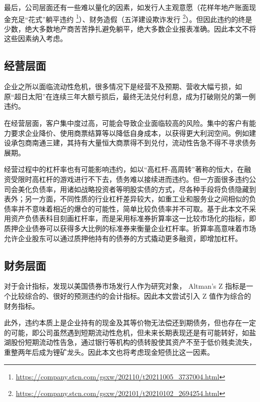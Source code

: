 最后，公司层面还有一些难以量化的因素，如发行人主观意愿（花样年地产账面现金充足“花式”躺平违约 \footnote{\url{https://company.stcn.com/gsxw/202110/t20211005_3737004.html}}）、财务造假（五洋建设欺诈发行 \footnote{\url{https://company.stcn.com/gsxw/202101/t20210102_2694254.html}}）。但因此违约的终是少数，绝大多数地产商苦苦挣扎避免躺平，绝大多数企业报表准确。因此本文不将这些因素纳入考虑。
\subsection{经营层面}
企业之所以面临流动性危机，很多情况下是经营不及预期、营收大幅亏损，如原“超日太阳”在连续三年大额亏损后，最终无法兑付利息，成为打破刚兑的第一例违约。

在经营层面，客户集中度过高，可能会导致企业面临较高的风险\cite{王雄元2017客户集中度与公司债二级市场信用利差}。集中的客户有能力要求企业降价、使用商票结算等以降低自身成本，以获得更大利润空间。例如建设承包商南通三建，其持有大量恒大商票得不到兑付，流动性告急不得不寻求债务展期。

经营过程中的杠杆率也有可能影响违约\cite{王永钦2019杠杆率如何影响资产价格}，如以“高杠杆-高周转”著称的恒大，在融资受限时高杠杆的游戏进行不下去，债务难以接续进而违约。但一方面很多违约公司会美化负债率，用诸如战略投资者等明股实债的方式，尽各种手段将负债隐藏到表外；另一方面，不同性质的行业杠杆差异较大，如重工业和服务业之间相似的负债率并不意味着相近的爆仓的可能性，简单比较负债率并不可取。基于此本文不采用资产负债表科目刻画杠杆率，而是采用标准券折算率这一比较市场化的指标，即质押企业债券可以获得多大比例的标准券来衡量企业杠杆率。折算率高意味着市场允许企业股东可以通过质押他持有的债券的方式撬动更多融资，即增加杠杆。

\subsection{财务层面}
对于会计指标，\Textcite{blochlinger2018ratings}发现以美国债券市场发行人作为研究对象， Altman's Z 指标是一个比较综合的、很好的预测违约的会计指标。因此本文尝试引入 Z 值作为综合的财务指标。

此外，违约本质上是企业持有的现金及其等价物无法偿还到期债务，但也存在一定的可能，即公司虽然遇到短期流动性危机，但未来长期表现还是有可能转好，如盐湖股份短期流动性告急，通过银行等机构的债转股使其资产不至于低价贱卖流失，重整两年后成为锂矿龙头。因此本文也将考虑现金短债比这一因素。

